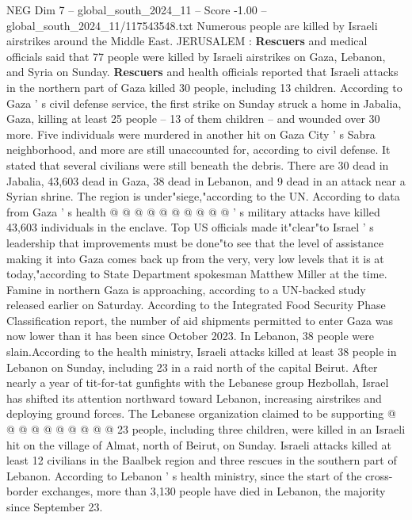 \begin{textsample}{NEG Dim 7 – global\_south\_2024\_11 – Score -1.00 – global\_south\_2024\_11/117543548.txt}  \label{ex:f7_neg_315}
Numerous people are killed by Israeli airstrikes around the Middle East.
JERUSALEM : \textbf{Rescuers} and medical officials said that 77 people were killed by Israeli airstrikes on Gaza, Lebanon, and Syria on Sunday. \textbf{Rescuers} and health officials reported that Israeli attacks in the northern part of Gaza killed 30 people, including 13 children.
According to Gaza ' s civil defense service, the first strike on Sunday struck a home in Jabalia, Gaza, killing at least 25 people -- 13 of them children -- and wounded over 30 more.
Five individuals were murdered in another hit on Gaza City ' s Sabra neighborhood, and more are still unaccounted for, according to civil defense.
It stated that several civilians were still beneath the debris.
There are 30 dead in Jabalia, 43,603 dead in Gaza, 38 dead in Lebanon, and 9 dead in an attack near a Syrian shrine.
The region is under"siege,"according to the UN.
According to data from Gaza ' s health @ @ @ @ @ @ @ @ @ @ ' s military attacks have killed 43,603 individuals in the enclave.
Top US officials made it"clear"to Israel ' s leadership that improvements must be done"to see that the level of assistance making it into Gaza comes back up from the very, very low levels that it is at today,"according to State Department spokesman Matthew Miller at the time.
Famine in northern Gaza is approaching, according to a UN-backed study released earlier on Saturday.
According to the Integrated Food Security Phase Classification report, the number of aid shipments permitted to enter Gaza was now lower than it has been since October 2023.
In Lebanon, 38 people were slain.According to the health ministry, Israeli attacks killed at least 38 people in Lebanon on Sunday, including 23 in a raid north of the capital Beirut.
After nearly a year of tit-for-tat gunfights with the Lebanese group Hezbollah, Israel has shifted its attention northward toward Lebanon, increasing airstrikes and deploying ground forces.
The Lebanese organization claimed to be supporting @ @ @ @ @ @ @ @ @ @ 23 people, including three children, were killed in an Israeli hit on the village of Almat, north of Beirut, on Sunday.
Israeli attacks killed at least 12 civilians in the Baalbek region and three rescues in the southern part of Lebanon.
According to Lebanon ' s health ministry, since the start of the cross-border exchanges, more than 3,130 people have died in Lebanon, the majority since September 23.

\end{textsample}
